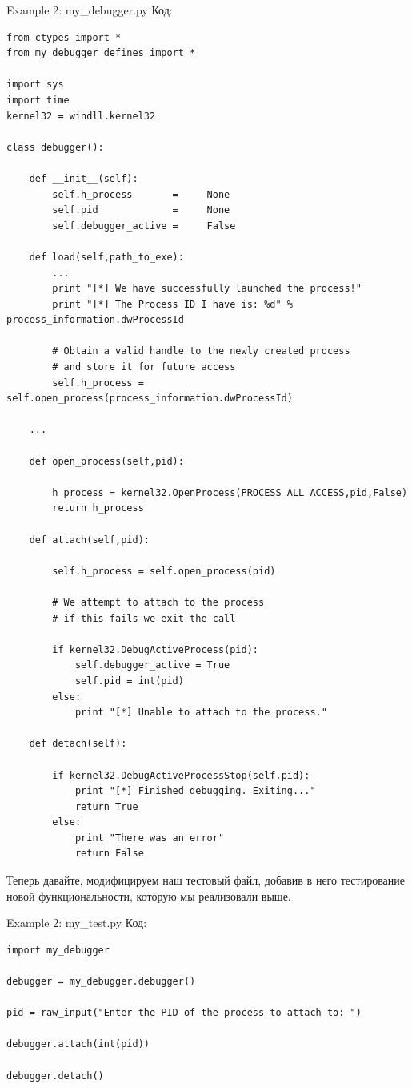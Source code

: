 \documentclass[12pt, a4paper, oneside]{book}
\begin{document}
Example 2: my\_debugger.py
Код:
\begin{verbatim}
from ctypes import *
from my_debugger_defines import *

import sys
import time
kernel32 = windll.kernel32

class debugger():

    def __init__(self):
        self.h_process       =     None
        self.pid             =     None
        self.debugger_active =     False
                                
    def load(self,path_to_exe):
        ...
        print "[*] We have successfully launched the process!"
        print "[*] The Process ID I have is: %d" % process_information.dwProcessId
        
        # Obtain a valid handle to the newly created process
        # and store it for future access
        self.h_process = self.open_process(process_information.dwProcessId)

    ...

    def open_process(self,pid):

        h_process = kernel32.OpenProcess(PROCESS_ALL_ACCESS,pid,False)
        return h_process

    def attach(self,pid):

        self.h_process = self.open_process(pid)

        # We attempt to attach to the process
        # if this fails we exit the call

        if kernel32.DebugActiveProcess(pid):
            self.debugger_active = True
            self.pid = int(pid)
        else:
            print "[*] Unable to attach to the process."

    def detach(self):

        if kernel32.DebugActiveProcessStop(self.pid):
            print "[*] Finished debugging. Exiting..."
            return True
        else:
            print "There was an error"
            return False
\end{verbatim}

Теперь давайте, модифицируем наш тестовый файл, добавив в него тестирование новой функциональности, которую мы реализовали выше. 

Example 2: my\_test.py
Код:
\begin{verbatim}
import my_debugger

debugger = my_debugger.debugger()

pid = raw_input("Enter the PID of the process to attach to: ")

debugger.attach(int(pid))

debugger.detach()
\end{verbatim}
\end{document}
